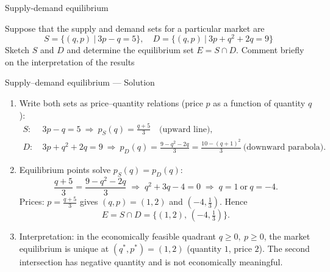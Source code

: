 \documentclass[9pt]{beamer}
\begin{document}
\begin{frame}{Supply-demand equilibrium}
    
    Suppose that the supply and demand sets for a particular market are 
    $$
    S = \{(q, p)\ |\ 3p - q = 5\},\quad D = \{(q, p)\ |\ 3p + q^2 + 2q = 9\}
    $$
    Sketch $S$ and $D$ and determine the equilibrium set $E = S \cap D$. Comment briefly on the interpretation of the results

\end{frame}

\begin{frame}{Supply–demand equilibrium — Solution}

\footnotesize

\begin{enumerate}[leftmargin = 0.5cm, label = $\bullet$, rightmargin = 0.2cm]
\item Write both sets as price–quantity relations (price $p$ as a function of quantity $q$):
\begin{align*}
    S:&\ 3p-q=5 \ \Longrightarrow\ p_S(q)=\frac{q+5}{3}\quad\text{(upward line)},\\    
    D:&\ 3p+q^2+2q=9 \ \Longrightarrow\ p_D(q)=\frac{9-q^2-2q}{3}=\frac{10-(q+1)^2}{3}\ \text{(downward parabola)}.
\end{align*}
\item Equilibrium points solve $p_S(q)=p_D(q)$:
\[
\frac{q+5}{3}=\frac{9-q^2-2q}{3}\;\Longrightarrow\; q^2+3q-4=0\;\Longrightarrow\; q=\boxed{1}\ \text{or}\ q=\boxed{-4}.
\]
Prices: $p=\frac{q+5}{3}$ gives $(q,p)=(1,2)$ and $(-4,\tfrac13)$. Hence
\[
\boxed{E=S\cap D=\{(1,2),\,(-4,\tfrac13)\}}.
\]
\item Interpretation: in the economically feasible quadrant $q\ge0,\ p\ge0$, the market equilibrium is unique at $\boxed{(q^*,p^*)=(1,2)}$ (quantity $1$, price $2$). The second intersection has negative quantity and is not economically meaningful.
\end{enumerate}

\end{frame}
\end{document}
